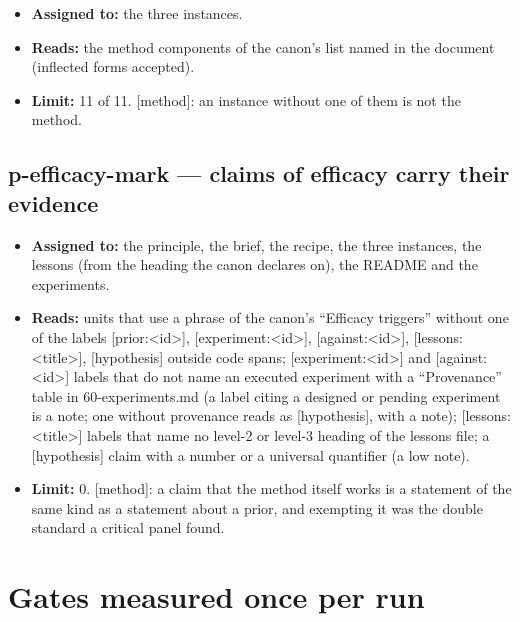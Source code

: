 \documentclass[
  american,
  10pt,
]{report}
\providecommand{\tightlist}{%
  \setlength{\itemsep}{0pt}\setlength{\parskip}{0pt}}
\renewcommand{\texttt}[1]{{\ttfamily\hyphenchar\font=-1 #1}}
\begin{document}
\begin{itemize}
\tightlist
\item
  \textbf{Assigned to:} the three instances.
\item
  \textbf{Reads:} the method components of the canon's list named in the
  document (inflected forms accepted).
\item
  \textbf{Limit:} 11 of 11. \texttt{[method]}: an instance without one
  of them is not the method.
\end{itemize}

\subsection{\texorpdfstring{\texttt{p-\allowbreak{}efficacy-\allowbreak{}mark}
--- claims of efficacy carry their
evidence}{ --- claims of efficacy carry their evidence}}\label{p-efficacy-mark-claims-of-efficacy-carry-their-evidence}

\begin{itemize}
\tightlist
\item
  \textbf{Assigned to:} the principle, the brief, the recipe, the three
  instances, the lessons (from the heading the canon declares on), the
  README and the experiments.
\item
  \textbf{Reads:} units that use a phrase of the canon's ``Efficacy
  triggers'' without one of the labels
  \texttt{[prior:\allowbreak{}<id>]},
  \texttt{[experiment:\allowbreak{}<id>]},
  \texttt{[against:\allowbreak{}<id>]},
  \texttt{[lessons:\allowbreak{}<title>]}, \texttt{[hypothesis]} outside
  code spans; \texttt{[experiment:\allowbreak{}<id>]} and
  \texttt{[against:\allowbreak{}<id>]} labels that do not name an
  executed experiment with a ``Provenance'' table in
  \texttt{60-\allowbreak{}experiments.\allowbreak{}md} (a label citing a
  designed or pending experiment is a note; one without provenance reads
  as \texttt{[hypothesis]}, with a note);
  \texttt{[lessons:\allowbreak{}<title>]} labels that name no level-2 or
  level-3 heading of the lessons file; a \texttt{[hypothesis]} claim
  with a number or a universal quantifier (a low note).
\item
  \textbf{Limit:} 0. \texttt{[method]}: a claim that the method itself
  works is a statement of the same kind as a statement about a prior,
  and exempting it was the double standard a critical panel found.
\end{itemize}

\section{Gates measured once per run}\label{gates-measured-once-per-run}
\end{document}
